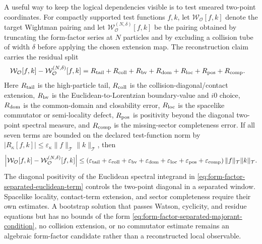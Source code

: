 \begin{controlledapproximation}
A useful way to keep the logical dependencies visible is to test smeared
two-point coordinates.  For compactly supported test functions \(f,k\), let
\(\mathcal W_{\mathcal O}[f,k]\) denote the target Wightman pairing and let
\(\mathcal W_{\mathcal O}^{(N,\delta)}[f,k]\) be the pairing obtained by
truncating the form-factor series at \(N\) particles and by excluding a
collision tube of width \(\delta\) before applying the chosen extension map.
The reconstruction claim carries the residual split
\begin{equation}
\begin{aligned}
  \mathcal W_{\mathcal O}[f,k]
  -
  \mathcal W_{\mathcal O}^{(N,\delta)}[f,k]
  &=
  R_{\rm tail}
  +R_{\rm coll}
  +R_{\rm bv}
  +R_{\rm dom}
  +R_{\rm loc}
  +R_{\rm pos}
  +R_{\rm comp}.
\end{aligned}
  \label{eq:form-factor-wightman-reconstruction-residual-split}
\end{equation}
Here \(R_{\rm tail}\) is the high-particle tail,
\(R_{\rm coll}\) is the collision-diagonal/contact extension,
\(R_{\rm bv}\) is the Euclidean-to-Lorentzian boundary-value and \(i0\)
choice, \(R_{\rm dom}\) is the common-domain and closability error,
\(R_{\rm loc}\) is the spacelike commutator or semi-locality defect,
\(R_{\rm pos}\) is positivity beyond the diagonal two-point spectral measure,
and \(R_{\rm comp}\) is the missing-sector completeness error.  If all seven
terms are bounded on the declared test-function norm by
\(|R_\kappa[f,k]|\le \varepsilon_\kappa\|f\|_{\mathcal T}\|k\|_{\mathcal T}\),
then
\begin{equation}
  \left|
    \mathcal W_{\mathcal O}[f,k]
    -
    \mathcal W_{\mathcal O}^{(N,\delta)}[f,k]
  \right|
  \le
  \left(
    \varepsilon_{\rm tail}
    +\varepsilon_{\rm coll}
    +\varepsilon_{\rm bv}
    +\varepsilon_{\rm dom}
    +\varepsilon_{\rm loc}
    +\varepsilon_{\rm pos}
    +\varepsilon_{\rm comp}
  \right)
  \|f\|_{\mathcal T}\|k\|_{\mathcal T}.
  \label{eq:form-factor-wightman-reconstruction-bound}
\end{equation}
The diagonal positivity of the Euclidean spectral integrand in
\eqref{eq:form-factor-separated-euclidean-term} controls the two-point
diagonal in a separated window.  Spacelike locality, contact-term extension,
and sector completeness require their own estimates.  A bootstrap solution
that passes Watson, cyclicity, and residue equations but has no bounds of the form
\eqref{eq:form-factor-separated-majorant-condition}, no collision extension,
or no commutator estimate remains an algebraic form-factor candidate rather
than a reconstructed local observable.
\end{controlledapproximation}


